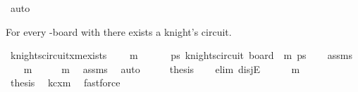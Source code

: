 \begin{isabellebody}
\ auto\isanewline
\ \ \isamarkupfalse%
\isanewline
{}\isamarkupfalse%
%
\endisatagproof
{\isafoldproof}%
%
\isadelimproof
%
\endisadelimproof
%
\begin{isamarkuptext}%
For every -board with  there exists a knight's circuit.%
\end{isamarkuptext}\isamarkuptrue%
\isamarkupfalse%
\ knights{\isacharunderscore}{\kern0pt}circuit{\isacharunderscore}{\kern0pt}{}xm{\isacharunderscore}{\kern0pt}exists{\isacharcolon}{\kern0pt}\ \isanewline
\ \ \ {\isachardoublequoteopen}m\ {\isasymge}\ {}{\isachardoublequoteclose}\ \isanewline
\ \ \ {\isachardoublequoteopen}{\isasymexists}ps{\isachardot}{\kern0pt}\ knights{\isacharunderscore}{\kern0pt}circuit\ {\isacharparenleft}{\kern0pt}board\ {}\ m{\isacharparenright}{\kern0pt}\ ps{\isachardoublequoteclose}\isanewline
%
\isadelimproof
\ \ %
\endisadelimproof
%
\isatagproof
{}\isamarkupfalse%
\ assms\isanewline
{}\isamarkupfalse%
\ {\isacharminus}{\kern0pt}\isanewline
\ \ \isamarkupfalse%
\ {\isachardoublequoteopen}m\ {\isasymin}\ {\isacharbraceleft}{\kern0pt}{}{\isacharcomma}{\kern0pt}{}{\isacharcomma}{\kern0pt}{}{\isacharcomma}{\kern0pt}{}{\isacharcomma}{\kern0pt}{}{\isacharbraceright}{\kern0pt}\ {\isasymor}\ {}\ {\isasymle}\ m{\isacharminus}{\kern0pt}{}{\isachardoublequoteclose}\ \isamarkupfalse%
\ assms\ \isamarkupfalse%
\ auto\isanewline
\ \ \isamarkupfalse%
\ \isamarkupfalse%
\ {\isacharquery}{\kern0pt}thesis\isanewline
\ \ \isamarkupfalse%
\ {\isacharparenleft}{\kern0pt}elim\ disjE{\isacharparenright}{\kern0pt}\isanewline
\ \ \ \ \isamarkupfalse%
\ {\isachardoublequoteopen}m\ {\isasymin}\ {\isacharbraceleft}{\kern0pt}{}{\isacharcomma}{\kern0pt}{}{\isacharcomma}{\kern0pt}{}{\isacharcomma}{\kern0pt}{}{\isacharcomma}{\kern0pt}{}{\isacharbraceright}{\kern0pt}{\isachardoublequoteclose}\isanewline
\ \ \ \ \isamarkupfalse%
\ \isamarkupfalse%
\ {\isacharquery}{\kern0pt}thesis\ \isamarkupfalse%
\ kc{\isacharunderscore}{\kern0pt}{}xm\ \isamarkupfalse%
\ fastforce\isanewline
\ \ \isamarkupfalse%

\end{isabellebody}
